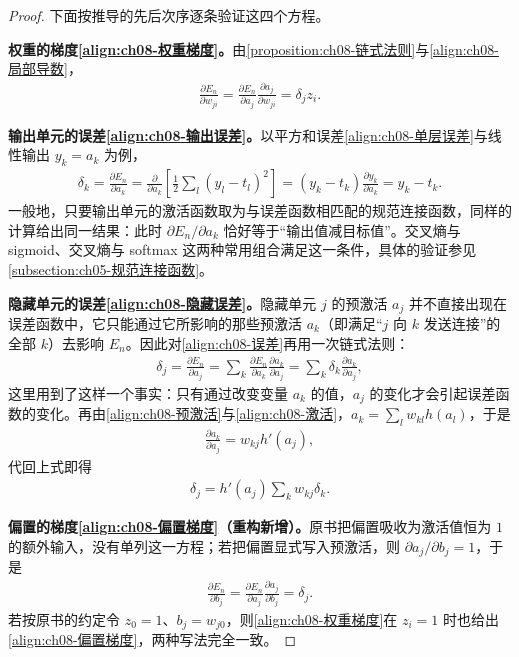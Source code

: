 \documentclass[../../main.tex]{subfiles}
\begin{document}
\begin{proof}
下面按推导的先后次序逐条验证这四个方程。

\textbf{权重的梯度\eqref{align:ch08-权重梯度}。}由\cref{proposition:ch08-链式法则}与\eqref{align:ch08-局部导数}，
\begin{align*}
\frac{\partial E_n}{\partial w_{ji}}=\frac{\partial E_n}{\partial a_j}\frac{\partial a_j}{\partial w_{ji}}=\delta_j z_i .
\end{align*}

\textbf{输出单元的误差\eqref{align:ch08-输出误差}。}以平方和误差\eqref{align:ch08-单层误差}与线性输出 $y_k=a_k$ 为例，
\begin{align*}
\delta_k=\frac{\partial E_n}{\partial a_k}=\frac{\partial}{\partial a_k}\left[\frac{1}{2}\sum_{l}\left(y_l-t_l\right)^{2}\right]=\left(y_k-t_k\right)\frac{\partial y_k}{\partial a_k}=y_k-t_k .
\end{align*}
一般地，只要输出单元的激活函数取为与误差函数相匹配的规范连接函数，同样的计算给出同一结果：此时 $\partial E_n/\partial a_k$ 恰好等于“输出值减目标值”。交叉熵与 sigmoid、交叉熵与 softmax 这两种常用组合满足这一条件，具体的验证参见\cref{subsection:ch05-规范连接函数}。

\textbf{隐藏单元的误差\eqref{align:ch08-隐藏误差}。}隐藏单元 $j$ 的预激活 $a_j$ 并不直接出现在误差函数中，它只能通过它所影响的那些预激活 $a_k$（即满足“$j$ 向 $k$ 发送连接”的全部 $k$）去影响 $E_n$。因此对\eqref{align:ch08-误差}再用一次链式法则：
\begin{align*}
\delta_j=\frac{\partial E_n}{\partial a_j}=\sum_{k}\frac{\partial E_n}{\partial a_k}\frac{\partial a_k}{\partial a_j}=\sum_{k}\delta_k\frac{\partial a_k}{\partial a_j},
\end{align*}
这里用到了这样一个事实：只有通过改变变量 $a_k$ 的值，$a_j$ 的变化才会引起误差函数的变化。再由\eqref{align:ch08-预激活}与\eqref{align:ch08-激活}，$a_k=\sum_{l}w_{kl}h(a_l)$，于是
\begin{align*}
\frac{\partial a_k}{\partial a_j}=w_{kj}h'(a_j),
\end{align*}
代回上式即得
\begin{align*}
\delta_j=h'(a_j)\sum_{k}w_{kj}\delta_k .
\end{align*}

\textbf{偏置的梯度\eqref{align:ch08-偏置梯度}（重构新增）。}原书把偏置吸收为激活值恒为 $1$ 的额外输入，没有单列这一方程；若把偏置显式写入预激活，则 $\partial a_j/\partial b_j=1$，于是
\begin{align*}
\frac{\partial E_n}{\partial b_j}=\frac{\partial E_n}{\partial a_j}\frac{\partial a_j}{\partial b_j}=\delta_j .
\end{align*}
若按原书的约定令 $z_0=1$、$b_j=w_{j0}$，则\eqref{align:ch08-权重梯度}在 $z_i=1$ 时也给出\eqref{align:ch08-偏置梯度}，两种写法完全一致。
\end{proof}
\end{document}
